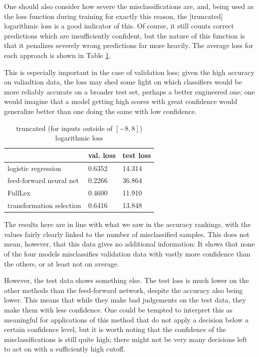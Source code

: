 \documentclass[a4paper, 12pt]{article}
\begin{document}
One should also consider how severe the misclassifications are, and, being used as the loss function during training for exactly this reason, the [truncated] logarithmic loss is a good indicator of this. Of course, it still counts correct predictions which are insufficiently confident, but the nature of this function is that it penalizes severely wrong predictions far more heavily. The average loss for each approach is shown in Table \ref{loss-an}.

This is especially important in the case of validation loss; given the high accuracy on valiadtion data, the loss may shed some light on which classifiers would be more reliably accurate on a broader test set, perhaps a better engineered one; one would imagine that a model getting high scores with great confidence would generalize better than one doing the same with low confidence.

\begin{table}[]
	\centering
	\begin{tabular}{l|l|l}
		                         & val. loss & test loss \\ \hline
		logistic regression      & 0.6352    & 14.314    \\
		feed-forward neural net  & 0.2266    & 36.864    \\
		FullLex                  & 0.4600    & 11.910    \\
		transformation selection & 0.6416    & 13.848
	\end{tabular}
	\caption{truncated (for inputs outside of $[-8, 8]$) logarithmic loss}
	\label{loss-an}
\end{table}

The results here are in line with what we saw in the accuracy rankings, with the values fairly clearly linked to the number of misclassified samples. This does not mean, however, that this data gives no additional information: It shows that none of the four models misclassifies validation data with vastly more confidence than the others, or at least not on average.

However, the test data shows something else. The test loss is much lower on the other methods than the feed-forward network, despite the accuracy also being lower. This means that while they make bad judgements on the test data, they make them with less confidence. One could be tempted to interpret this as meaningful for applications of this method that do not apply a decision below a certain confidence level, but it is worth noting that the confidence of the misclassifications is still quite high; there might not be very many decisions left to act on with a sufficiently high cutoff.
\end{document}
